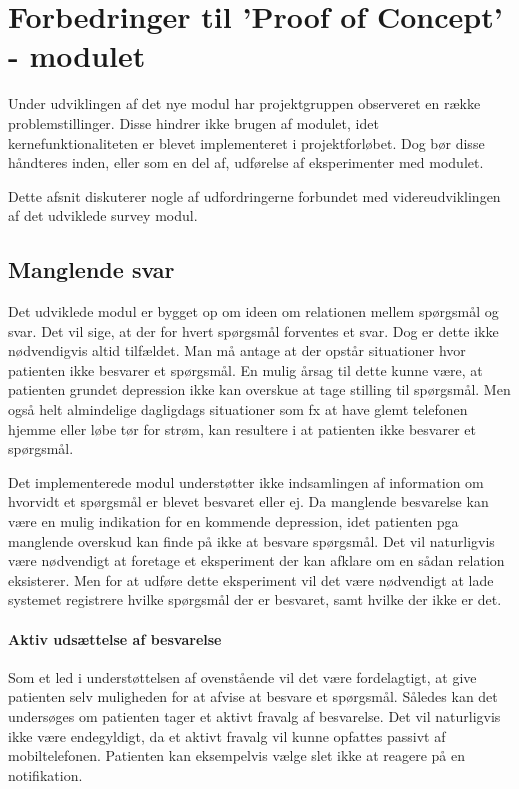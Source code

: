 
\section{Forbedringer til 'Proof of Concept' - modulet}
Under udviklingen af det nye modul har projektgruppen observeret en række problemstillinger.
Disse hindrer ikke brugen af modulet, idet kernefunktionaliteten er blevet implementeret i projektforløbet.
Dog bør disse håndteres inden, eller som en del af, udførelse af eksperimenter med modulet.

Dette afsnit diskuterer nogle af udfordringerne forbundet med videreudviklingen af det udviklede survey modul.

\subsection{Manglende svar}
Det udviklede modul er bygget op om ideen om relationen mellem spørgsmål og svar.
Det vil sige, at der for hvert spørgsmål forventes et svar.
Dog er dette ikke nødvendigvis altid tilfældet.
Man må antage at der opstår situationer hvor patienten ikke besvarer et spørgsmål.
En mulig årsag til dette kunne være, at patienten grundet depression ikke kan overskue at tage stilling til spørgsmål.
Men også helt almindelige dagligdags situationer som fx at have glemt telefonen hjemme eller løbe tør for strøm, kan resultere i at patienten ikke besvarer et spørgsmål.

Det implementerede modul understøtter ikke indsamlingen af information om hvorvidt et spørgsmål er blevet besvaret eller ej.
Da manglende besvarelse kan være en mulig indikation for en kommende depression, idet patienten pga manglende overskud kan finde på ikke at besvare spørgsmål.
Det vil naturligvis være nødvendigt at foretage et eksperiment der kan afklare om en sådan relation eksisterer.
Men for at udføre dette eksperiment vil det være nødvendigt at lade systemet registrere hvilke spørgsmål der er besvaret, samt hvilke der ikke er det.

\paragraph{Aktiv udsættelse af besvarelse}
Som et led i understøttelsen af ovenstående vil det være fordelagtigt, at give patienten selv muligheden for at afvise at besvare et spørgsmål.
Således kan det undersøges om patienten tager et aktivt fravalg af besvarelse.
Det vil naturligvis ikke være endegyldigt, da et aktivt fravalg vil kunne opfattes passivt af mobiltelefonen.
Patienten kan eksempelvis vælge slet ikke at reagere på en notifikation.


